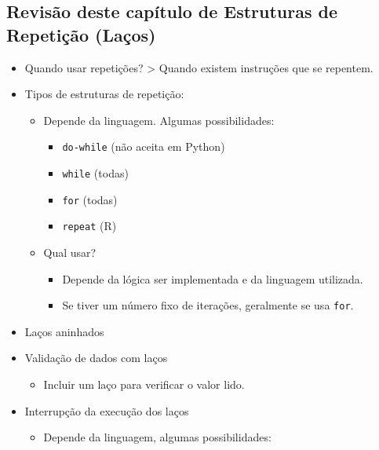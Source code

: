 \documentclass[12pt,a4paper]{article}
\providecommand{\tightlist}{%
      \setlength{\itemsep}{0pt}\setlength{\parskip}{0pt}}
\begin{document}
    \hypertarget{revisuxe3o-deste-capuxedtulo-de-estruturas-de-repetiuxe7uxe3o-lauxe7os}{%
\subsection{Revisão deste capítulo de Estruturas de Repetição
(Laços)}\label{revisuxe3o-deste-capuxedtulo-de-estruturas-de-repetiuxe7uxe3o-lauxe7os}}

\begin{itemize}
\tightlist
\item
  Quando usar repetições? \textgreater{} Quando existem instruções que
  se repentem.
\item
  Tipos de estruturas de repetição:

  \begin{itemize}
  \tightlist
  \item
    Depende da linguagem. Algumas possibilidades:

    \begin{itemize}
    \tightlist
    \item
      \texttt{do-while} (não aceita em Python)
    \item
      \texttt{while} (todas)
    \item
      \texttt{for} (todas)
    \item
      \texttt{repeat} (R)
    \end{itemize}
  \item
    Qual usar?

    \begin{itemize}
    \tightlist
    \item
      Depende da lógica ser implementada e da linguagem utilizada.
    \item
      Se tiver um número fixo de iterações, geralmente se usa
      \texttt{for}.
    \end{itemize}
  \end{itemize}
\item
  Laços aninhados
\item
  Validação de dados com laços

  \begin{itemize}
  \tightlist
  \item
    Incluir um laço para verificar o valor lido.
  \end{itemize}
\item
  Interrupção da execução dos laços

  \begin{itemize}
  \tightlist
  \item
    Depende da linguagem, algumas possibilidades:


\end{itemize}
\end{itemize}
\end{document}

